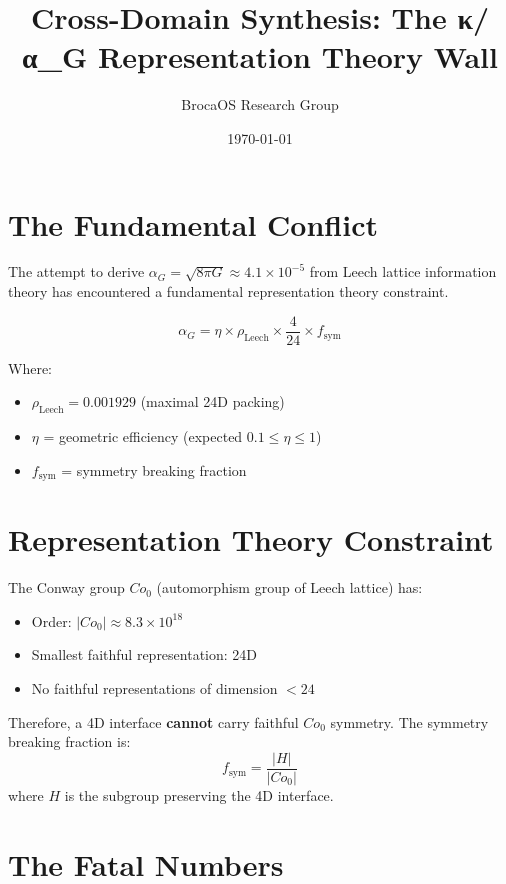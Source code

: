 \documentclass[11pt]{article}
\title{Cross-Domain Synthesis: The κ/α_G Representation Theory Wall}
\author{BrocaOS Research Group}
\date{\today}
\begin{document}
\maketitle

\section{The Fundamental Conflict}

The attempt to derive $\alpha_G = \sqrt{8\pi G} \approx 4.1\times10^{-5}$ from
Leech lattice information theory has encountered a fundamental representation
theory constraint.

\begin{equation}
\alpha_G = \eta \times \rho_{\text{Leech}} \times \frac{4}{24} \times f_{\text{sym}}
\end{equation}

Where:
\begin{itemize}
\item $\rho_{\text{Leech}} = 0.001929$ (maximal 24D packing)
\item $\eta$ = geometric efficiency (expected $0.1 \leq \eta \leq 1$)
\item $f_{\text{sym}}$ = symmetry breaking fraction
\end{itemize}

\section{Representation Theory Constraint}

The Conway group $Co_0$ (automorphism group of Leech lattice) has:
\begin{itemize}
\item Order: $|Co_0| \approx 8.3\times 10^{18}$
\item Smallest faithful representation: 24D
\item No faithful representations of dimension $< 24$
\end{itemize}

Therefore, a 4D interface \textbf{cannot} carry faithful $Co_0$ symmetry.
The symmetry breaking fraction is:
\begin{equation}
f_{\text{sym}} = \frac{|H|}{|Co_0|}
\end{equation}
where $H$ is the subgroup preserving the 4D interface.

\section{The Fatal Numbers}
\end{document}
